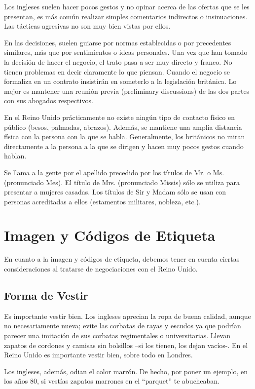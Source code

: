 \documentclass[letterpaper, 12pt]{article}
\begin{document}
Los ingleses suelen hacer pocos gestos y no opinar acerca de las ofertas que se
les presentan, es más común realizar simples comentarios indirectos o
insinuaciones. Las tácticas agresivas no son muy bien vistas por ellos.

En las decisiones, suelen guiarse por normas establecidas o por precedentes
similares, más que por sentimientos o ideas personales. Una vez que han tomado
la decisión de hacer el negocio, el trato pasa a ser muy directo y franco. No
tienen problemas en decir claramente lo que piensan. Cuando el negocio se
formaliza en un contrato insistirán en someterlo a la legislación británica. Lo
mejor es mantener una reunión previa (preliminary discussions) de las dos
partes con sus abogados respectivos.

En el Reino Unido prácticamente no existe ningún tipo de contacto físico en
público (besos, palmadas, abrazos). Además, se mantiene una amplia distancia
física con la persona con la que se habla. Generalmente, los británicos no
miran directamente a la persona a la que se dirigen y hacen muy pocos gestos
cuando hablan.

Se llama a la gente por el apellido precedido por los títulos de Mr. o Ms.
(pronunciado Mes). El título de Mrs. (pronunciado Missis) sólo se utiliza para
presentar a mujeres casadas. Los títulos de Sir y Madam sólo se usan con
personas acreditadas a ellos (estamentos militares, nobleza, etc.).

\section*{Imagen y Códigos de Etiqueta}

En cuanto a la imagen y códigos de etiqueta, debemos tener en cuenta ciertas
consideraciones al tratarse de negociaciones con el Reino Unido.

\subsection*{Forma de Vestir}

Es importante vestir bien. Los ingleses aprecian la ropa de buena calidad,
aunque no necesariamente nueva; evite las corbatas de rayas y escudos ya que
podrían parecer una imitación de sus corbatas regimentales o universitarias.
Llevan zapatos de cordones y camisas sin bolsillos $–$si los tienen, los dejan
vacíos$‐$. En el Reino Unido es importante vestir bien, sobre todo en Londres.

Los ingleses, además, odian el color marrón. De hecho, por poner un ejemplo, en
los años 80, si vestías zapatos marrones en el ``parquet'' te abucheaban.
\end{document}
